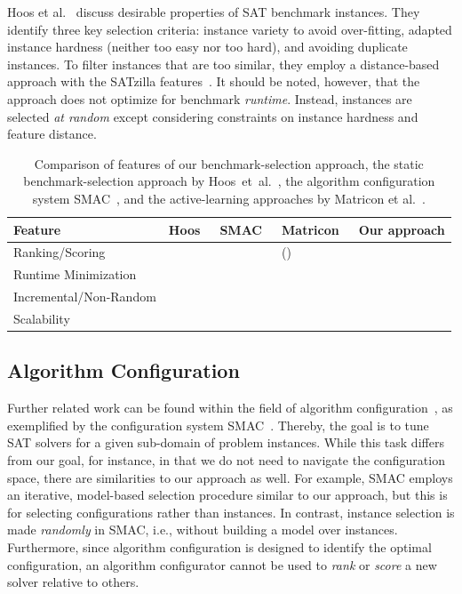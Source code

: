 \documentclass[sn-basic, Numbered]{sn-jnl} %
\newcommand{\cmark}{\ding{51}} %
\newcommand{\xmark}{\ding{55}}
\begin{document}
Hoos et al.~\cite{HoosKSS13} discuss desirable properties of SAT benchmark instances.
They identify three key selection criteria: instance variety to avoid over-fitting, adapted instance hardness (neither too easy nor too hard), and avoiding duplicate instances. 
To filter instances that are too similar, they employ a distance-based approach with the SATzilla features~\cite{XuHHL08,features}.
It should be noted, however, that the approach does not optimize for benchmark \emph{runtime}.
Instead, instances are selected \emph{at random} except considering constraints on instance hardness and feature distance.

\begin{table}[tbp]
  \centering
  \caption{Comparison of features of our benchmark-selection approach, the static benchmark-selection approach by Hoos~et~al.~\cite{HoosKSS13}, the algorithm configuration system SMAC~\cite{HutterHL11}, and the active-learning approaches by Matricon et al.~\cite{MatriconAFSH21}.
  }
  \label{tab:requirements}
  \begin{tabular}{
    m{}
    >{\centering\arraybackslash}m{}
    >{\centering\arraybackslash}m{}
    >{\centering\arraybackslash}m{}
    >{\centering\arraybackslash}m{}
  }
    \toprule
    Feature & Hoos~\cite{HoosKSS13} & SMAC~\cite{HutterHL11} & Matricon~\cite{MatriconAFSH21} & Our approach \\
    \midrule
    Ranking/Scoring & \cmark & \xmark & (\cmark) & \cmark \\
    Runtime Minimization & \xmark & \cmark & \cmark & \cmark \\
    Incremental/Non-Random & \xmark & \xmark & \cmark & \cmark \\
    Scalability & \cmark & \cmark & \xmark & \cmark \\
    \bottomrule
  \end{tabular}
\end{table}

\subsection{Algorithm Configuration}
\label{sec:related:algo-configuration}

Further related work can be found within the field of algorithm configuration~\cite{HoosHL21,Stutzle0P22}, as exemplified by the configuration system SMAC~\cite{HutterHL11}.
Thereby, the goal is to tune SAT solvers for a given sub-domain of problem instances.
While this task differs from our goal, for instance, in that we do not need to navigate the configuration space, there are similarities to our approach as well.
For example, SMAC employs an iterative, model-based selection procedure similar to our approach, but this is for selecting configurations rather than instances.
In contrast, instance selection is made \emph{randomly} in SMAC, i.e., without building a model over instances.
Furthermore, since algorithm configuration is designed to identify the optimal configuration, an algorithm configurator cannot be used to \emph{rank} or \emph{score} a new solver relative to others.
\end{document}
